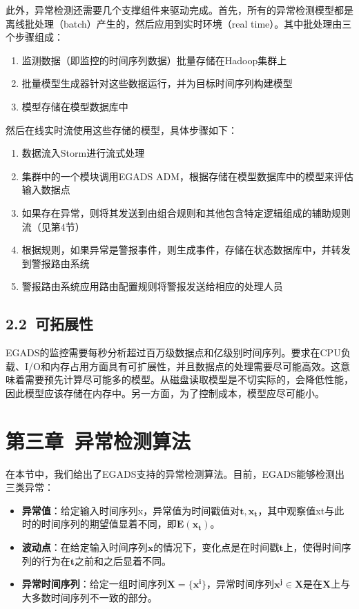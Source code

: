\documentclass[a4paper,AutoFakeBold,oneside,12pt]{book}
\begin{document}
此外，异常检测还需要几个支撑组件来驱动完成。首先，所有的异常检测模型都是离线批处理（batch）产生的，然后应用到实时环境（real time）。其中批处理由三个步骤组成：

\begin{enumerate}
\item 监测数据（即监控的时间序列数据）批量存储在Hadoop集群上
\item 批量模型生成器针对这些数据运行，并为目标时间序列构建模型
\item 模型存储在模型数据库中
\end{enumerate}

然后在线实时流使用这些存储的模型，具体步骤如下：

\begin{enumerate}
\item 数据流入Storm进行流式处理
\item 集群中的一个模块调用EGADS ADM，根据存储在模型数据库中的模型来评估输入数据点
\item 如果存在异常，则将其发送到由组合规则和其他包含特定逻辑组成的辅助规则流（见第4节）
\item 根据规则，如果异常是警报事件，则生成事件，存储在状态数据库中，并转发到警报路由系统
\item 警报路由系统应用路由配置规则将警报发送给相应的处理人员
\end{enumerate}

\section*{2.2\ 可拓展性}
	EGADS的监控需要每秒分析超过百万级数据点和亿级别时间序列。要求在CPU负载、I/O和内存占用方面具有可扩展性，并且数据点的处理需要尽可能高效。这意味着需要预先计算尽可能多的模型。从磁盘读取模型是不切实际的，会降低性能，因此模型应该存储在内存中。另一方面，为了控制成本，模型应尽可能小。


\chapter*{第三章\ 异常检测算法}
	在本节中，我们给出了EGADS支持的异常检测算法。目前，EGADS能够检测出三类异常：

\begin{itemize}
\item \textbf{异常值}：给定输入时间序列x，异常值为时间戳值对$\bm{t,x_t}$，其中观察值xt与此时的时间序列的期望值显着不同，即$\bm{E(x_t)}$。
\item \textbf{波动点}：在给定输入时间序列$\bm{x}$的情况下，变化点是在时间戳$\bm{t}$上，使得时间序列的行为在$\bm{t}$之前和之后显着不同。
\item \textbf{异常时间序列}：给定一组时间序列$\bm{X = \{x^i\}}$，异常时间序列$\bm{x^j\in X}$是在$\bm{X}$上与大多数时间序列不一致的部分。
\end{itemize}
\end{document}
